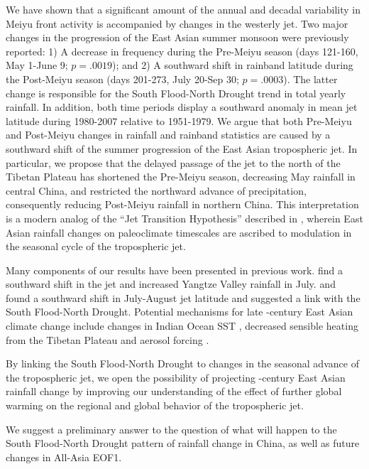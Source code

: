 	We have shown that a significant amount of the annual and decadal variability in Meiyu front activity is accompanied by changes in the westerly jet. Two major changes in the progression of the East Asian summer monsoon were previously reported: 1) A decrease in frequency during the Pre-Meiyu season (days 121-160, May 1-June 9; $p=.0019$); and 2) A southward shift in rainband latitude during the Post-Meiyu season (days 201-273, July 20-Sep 30; $p=.0003$). The latter change is responsible for the South Flood-North Drought trend in total yearly rainfall. In addition, both time periods display a southward anomaly in mean jet latitude during 1980-2007 relative to 1951-1979. We argue that both Pre-Meiyu and Post-Meiyu changes in rainfall and rainband statistics are caused by a southward shift of the summer progression of the East Asian tropospheric jet. In particular, we propose that the delayed passage of the jet to the north of the Tibetan Plateau has shortened the Pre-Meiyu season, decreasing May rainfall in central China, and restricted the northward advance of precipitation, consequently reducing Post-Meiyu rainfall in northern China. This interpretation is a modern analog of the ``Jet Transition Hypothesis'' described in \citet{Chiang2015}, wherein East Asian rainfall changes on paleoclimate timescales are ascribed to modulation in the seasonal cycle of the tropospheric jet. 	
 
	Many components of our results have been presented in previous work. \citet{Xuan2011} find a southward shift in the jet and increased Yangtze Valley rainfall in July. \citet{Yu2004} and \citet{Yu2007} found a southward shift in July-August jet latitude and suggested a link with the South Flood-North Drought. Potential mechanisms for late -century East Asian climate change include changes in Indian Ocean SST \citep{Qu2012}, decreased sensible heating from the Tibetan Plateau \citep{Liu2012a,Hu2015} and aerosol forcing \citep{Song2014}.
	
 By linking the South Flood-North Drought to changes in the seasonal advance of the tropospheric jet, we open the possibility of projecting -century East Asian rainfall change by improving our understanding of the effect of further global warming on the regional and global behavior of the tropospheric jet.
	
	
	We suggest a preliminary answer to the question of what will happen to the South Flood-North Drought pattern of rainfall change in China, as well as future changes in All-Asia EOF1.

